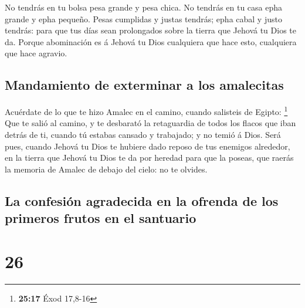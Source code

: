  No tendrás en tu bolsa pesa grande y pesa chica.
 No tendrás en tu casa epha grande y epha pequeño.
 Pesas cumplidas y justas tendrás; epha cabal y justo
tendrás: para que tus días sean prolongados sobre la tierra que Jehová
tu Dios te da.  Porque abominación es á Jehová tu Dios
cualquiera que hace esto, cualquiera que hace agravio.

\hypertarget{mandamiento-de-exterminar-a-los-amalecitas}{%
\subsection{Mandamiento de exterminar a los
amalecitas}\label{mandamiento-de-exterminar-a-los-amalecitas}}

 Acuérdate de lo que te hizo Amalec en el camino, cuando
salisteis de Egipto: \footnote{\textbf{25:17} Éxod 17,8-16}
 Que te salió al camino, y te desbarató la retaguardia de
todos los flacos que iban detrás de ti, cuando tú estabas cansado y
trabajado; y no temió á Dios.  Será pues, cuando Jehová
tu Dios te hubiere dado reposo de tus enemigos alrededor, en la tierra
que Jehová tu Dios te da por heredad para que la poseas, que raerás la
memoria de Amalec de debajo del cielo: no te olvides.

\hypertarget{la-confesiuxf3n-agradecida-en-la-ofrenda-de-los-primeros-frutos-en-el-santuario}{%
\subsection{La confesión agradecida en la ofrenda de los primeros frutos
en el
santuario}\label{la-confesiuxf3n-agradecida-en-la-ofrenda-de-los-primeros-frutos-en-el-santuario}}

\hypertarget{section-25}{%
\section{26}\label{section-25}}

